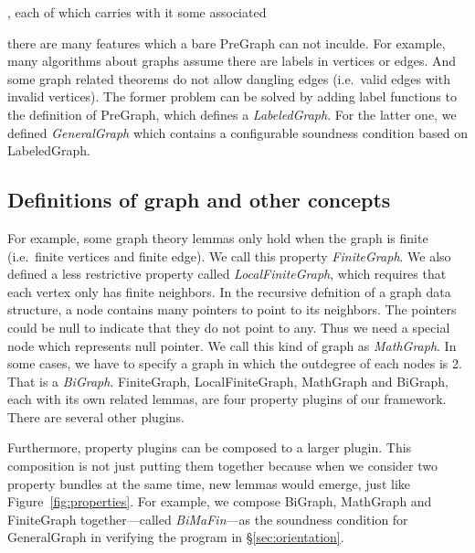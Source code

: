 , each of which carries with it some associated 

there are many features
which a bare PreGraph can not inculde. For example, many algorithms
about graphs assume there are labels in vertices or edges. And some
graph related theorems do not allow dangling edges (i.e.\ valid edges
with invalid vertices). The former problem can be solved by adding
label functions to the definition of PreGraph, which defines
a \emph{LabeledGraph}. For the latter one, we
defined \emph{GeneralGraph} which contains a configurable soundness
condition based on LabeledGraph.




\subsection{Definitions of graph and other concepts}


For example, some graph theory lemmas only hold when the graph is
finite (i.e.\ finite vertices and finite edge). We call this
property \emph{FiniteGraph}. We also defined a less restrictive
property called \emph{LocalFiniteGraph}, which requires that each
vertex only has finite neighbors. In the recursive defnition of a
graph data structure, a node contains many pointers to point to its
neighbors. The pointers could be null to indicate that they do not
point to any. Thus we need a special node which represents null
pointer. We call this kind of graph as \emph{MathGraph}. In some
cases, we have to specify a graph in which the outdegree of each nodes
is 2. That is a \emph{BiGraph}. FiniteGraph, LocalFiniteGraph,
MathGraph and BiGraph, each with its own related lemmas, are four
property plugins of our framework. There are several other plugins.


Furthermore, property plugins can be composed to a larger plugin. This
composition is not just putting them together because when we consider
two property bundles at the same time, new lemmas would emerge, just
like Figure~\ref{fig:properties}. For example, we compose BiGraph,
MathGraph and FiniteGraph together---called \emph{BiMaFin}---as the
soundness condition for GeneralGraph in verifying the program
in \S\ref{sec:orientation}.

